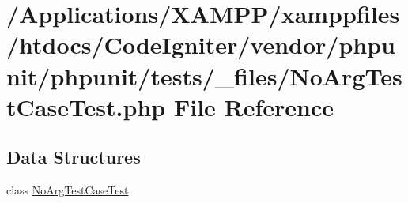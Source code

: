 \hypertarget{_no_arg_test_case_test_8php}{}\section{/\+Applications/\+X\+A\+M\+P\+P/xamppfiles/htdocs/\+Code\+Igniter/vendor/phpunit/phpunit/tests/\+\_\+files/\+No\+Arg\+Test\+Case\+Test.php File Reference}
\label{_no_arg_test_case_test_8php}
\subsection*{Data Structures}
\begin{DoxyCompactItemize}
\item 
class \mbox{\hyperlink{class_no_arg_test_case_test}{No\+Arg\+Test\+Case\+Test}}
\end{DoxyCompactItemize}
